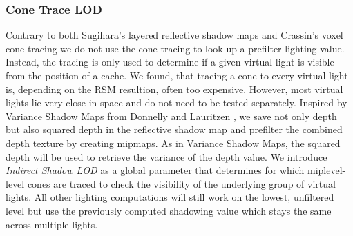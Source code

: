 \documentclass[thesis.tex]{subfiles}
\begin{document}
\subsubsection{Cone Trace LOD}
Contrary to both Sugihara's layered reflective shadow maps and Crassin's voxel cone tracing we do not use the cone tracing to look up a prefilter lighting value.
Instead, the tracing is only used to determine if a given virtual light is visible from the position of a cache.
We found, that tracing a cone to every virtual light is, depending on the RSM resultion, often too expensive.
However, most virtual lights lie very close in space and do not need to be tested separately.
Inspired by Variance Shadow Maps from Donnelly and Lauritzen \cite{bib:vsm}, we save not only depth but also squared depth in the reflective shadow map and prefilter the combined depth texture by creating mipmaps.
As in Variance Shadow Maps, the squared depth will be used to retrieve the variance of the depth value.
We introduce \emph{Indirect Shadow LOD} as a global parameter that determines for which miplevel-level cones are traced to check the visibility of the underlying group of virtual lights. 
All other lighting computations will still work on the lowest, unfiltered level but use the previously computed shadowing value which stays the same across multiple lights.\\
\end{document}
